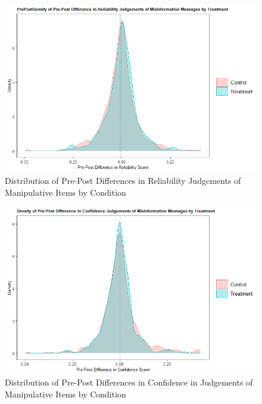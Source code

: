 \documentclass[empirical, authordate, issue]{jote-new-article}
\begin{document}
\begin{figure}[h!]

  \includegraphics[width=\linewidth]{media/supplement/images1.jpeg}
  \caption{Distribution of Pre-Post Differences in Reliability Judgements of Manipulative Items by Condition}
  \label{fig:figS1}
\end{figure}




\begin{figure}[h!]

  \includegraphics[width=\linewidth]{media/supplement/images2.jpeg}
  \caption{Distribution of Pre-Post Differences in Confidence in Judgements of Manipulative Items by Condition}
  \label{fig:figS2}


\end{figure}
\end{document}
